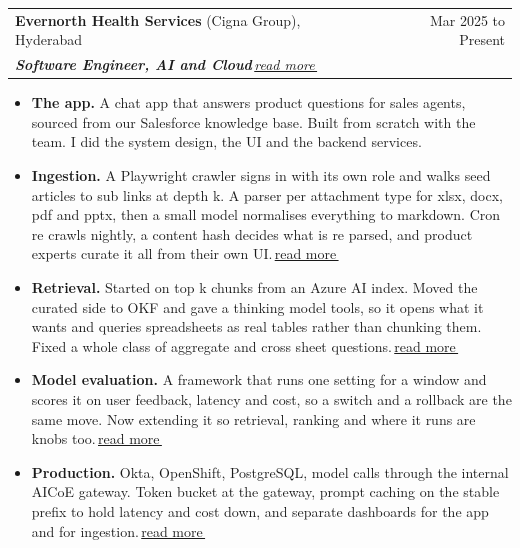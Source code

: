 \documentclass[a4paper,9pt]{article}
\makeatletter
\newenvironment{rItems}{
  \begin{itemize}[nosep, after=\strut, leftmargin=1.2em, itemsep=2pt, topsep=2pt]
}{
  \end{itemize}
}
\newcommand{\role}[4]{%
  \begin{tabularx}{\linewidth}{@{}X r@{}}
    \color[HTML]{1C033C}\textbf{#1} {\small #2} & \color[HTML]{371e77}\small{#4}\\[1pt]
    \color[HTML]{371e77}\textit{#3} &
  \end{tabularx}%
}
\newcommand{\more}[1]{\,\href{#1}{\footnotesize read more\,\faExternalLinkAlt}}
\makeatother
\begin{document}
\role{Evernorth Health Services}{(Cigna Group), Hyderabad}{\textbf{Software Engineer, AI and Cloud}\more{https://rishavraj.info/projects/knowledge-assistant.html}}{Mar 2025 to Present}
\begin{rItems}
  \item \textbf{The app.} A chat app that answers product questions for sales agents, sourced from our Salesforce knowledge base. Built from scratch with the team. I did the system design, the UI and the backend services.
  \item \textbf{Ingestion.} A Playwright crawler signs in with its own role and walks seed articles to sub links at depth k. A parser per attachment type for xlsx, docx, pdf and pptx, then a small model normalises everything to markdown. Cron re crawls nightly, a content hash decides what is re parsed, and product experts curate it all from their own UI.\more{https://rishavraj.info/projects/knowledge-assistant.html\#ingestion}
  \item \textbf{Retrieval.} Started on top k chunks from an Azure AI index. Moved the curated side to OKF and gave a thinking model tools, so it opens what it wants and queries spreadsheets as real tables rather than chunking them. Fixed a whole class of aggregate and cross sheet questions.\more{https://rishavraj.info/projects/knowledge-assistant.html\#okf}
  \item \textbf{Model evaluation.} A framework that runs one setting for a window and scores it on user feedback, latency and cost, so a switch and a rollback are the same move. Now extending it so retrieval, ranking and where it runs are knobs too.\more{https://rishavraj.info/projects/knowledge-assistant.html\#evals}
  \item \textbf{Production.} Okta, OpenShift, PostgreSQL, model calls through the internal AICoE gateway. Token bucket at the gateway, prompt caching on the stable prefix to hold latency and cost down, and separate dashboards for the app and for ingestion.\more{https://rishavraj.info/projects/knowledge-assistant.html\#running}
\end{rItems}

\vspace{3pt}
\end{document}

